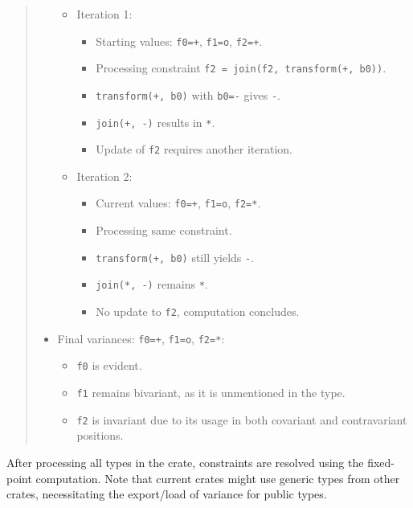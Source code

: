 \documentclass[
  11pt,
  twoside,symmetric]{report}
\providecommand{\tightlist}{%
  \setlength{\itemsep}{0pt}\setlength{\parskip}{0pt}}
\begin{document}
\begin{quote}
\begin{itemize}
  \begin{itemize}
  \tightlist
  \item
    Iteration 1:

    \begin{itemize}
    \tightlist
    \item
      Starting values: \texttt{f0=+}, \texttt{f1=o}, \texttt{f2=+}.
    \item
      Processing constraint
      \texttt{f2\ =\ join(f2,\ transform(+,\ b0))}.
    \item
      \texttt{transform(+,\ b0)} with \texttt{b0=-} gives \texttt{-}.
    \item
      \texttt{join(+,\ -)} results in \texttt{*}.
    \item
      Update of \texttt{f2} requires another iteration.
    \end{itemize}
  \item
    Iteration 2:

    \begin{itemize}
    \tightlist
    \item
      Current values: \texttt{f0=+}, \texttt{f1=o}, \texttt{f2=*}.
    \item
      Processing same constraint.
    \item
      \texttt{transform(+,\ b0)} still yields \texttt{-}.
    \item
      \texttt{join(*,\ -)} remains \texttt{*}.
    \item
      No update to \texttt{f2}, computation concludes.
    \end{itemize}
  \end{itemize}
\item
  Final variances: \texttt{f0=+}, \texttt{f1=o}, \texttt{f2=*}:

  \begin{itemize}
  \tightlist
  \item
    \texttt{f0} is evident.
  \item
    \texttt{f1} remains bivariant, as it is unmentioned in the type.
  \item
    \texttt{f2} is invariant due to its usage in both covariant and
    contravariant positions.
  \end{itemize}
\end{itemize}
\end{quote}

After processing all types in the crate, constraints are resolved using
the fixed-point computation. Note that current crates might use generic
types from other crates, necessitating the export/load of variance for
public types.
\end{document}
